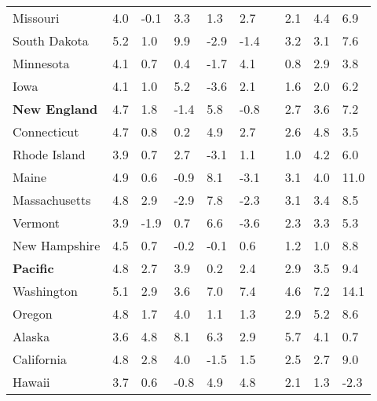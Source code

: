 {\begin{tabular}{p{29mm} R{8.5mm} R{8.5mm} R{8.5mm} R{8.5mm} 
             R{8.5mm} p{0mm} R{11mm} R{11mm} R{12mm} }
\hspace{3mm}  Missouri  & 4.0 & -0.1 & 3.3 & 1.3 & 2.7 &  & 2.1 & 4.4 & 6.9 \\
\hspace{3mm}  South Dakota  & 5.2 & 1.0 & 9.9 & -2.9 & -1.4 &  & 3.2 & 3.1 & 7.6 \\
\hspace{3mm}  Minnesota  & 4.1 & 0.7 & 0.4 & -1.7 & 4.1 &  & 0.8 & 2.9 & 3.8 \\
\hspace{3mm}  Iowa  & 4.1 & 1.0 & 5.2 & -3.6 & 2.1 &  & 1.6 & 2.0 & 6.2 \\
\hspace{1mm} \textbf{New England}  & 4.7 & 1.8 & -1.4 & 5.8 & -0.8 &  & 2.7 & 3.6 & 7.2 \\
\hspace{3mm}  Connecticut  & 4.7 & 0.8 & 0.2 & 4.9 & 2.7 &  & 2.6 & 4.8 & 3.5 \\
\hspace{3mm}  Rhode Island  & 3.9 & 0.7 & 2.7 & -3.1 & 1.1 &  & 1.0 & 4.2 & 6.0 \\
\hspace{3mm}  Maine  & 4.9 & 0.6 & -0.9 & 8.1 & -3.1 &  & 3.1 & 4.0 & 11.0 \\
\hspace{3mm}  Massachusetts  & 4.8 & 2.9 & -2.9 & 7.8 & -2.3 &  & 3.1 & 3.4 & 8.5 \\
\hspace{3mm}  Vermont  & 3.9 & -1.9 & 0.7 & 6.6 & -3.6 &  & 2.3 & 3.3 & 5.3 \\
\hspace{3mm}  New Hampshire  & 4.5 & 0.7 & -0.2 & -0.1 & 0.6 &  & 1.2 & 1.0 & 8.8 \\
\hspace{1mm} \textbf{Pacific}  & 4.8 & 2.7 & 3.9 & 0.2 & 2.4 &  & 2.9 & 3.5 & 9.4 \\
\hspace{3mm}  Washington  & 5.1 & 2.9 & 3.6 & 7.0 & 7.4 &  & 4.6 & 7.2 & 14.1 \\
\hspace{3mm}  Oregon  & 4.8 & 1.7 & 4.0 & 1.1 & 1.3 &  & 2.9 & 5.2 & 8.6 \\
\hspace{3mm}  Alaska  & 3.6 & 4.8 & 8.1 & 6.3 & 2.9 &  & 5.7 & 4.1 & 0.7 \\
\hspace{3mm}  California  & 4.8 & 2.8 & 4.0 & -1.5 & 1.5 &  & 2.5 & 2.7 & 9.0 \\
\hspace{3mm}  Hawaii  & 3.7 & 0.6 & -0.8 & 4.9 & 4.8 &  & 2.1 & 1.3 & -2.3 \\

\end{tabular}}
